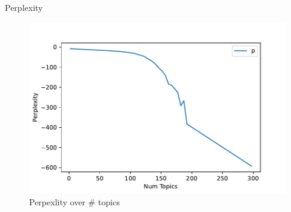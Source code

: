 \documentclass[aspectratio=169,xcolor=dvipsnames]{beamer}
\begin{document}
\begin{frame}{Perplexity}
    \vspace{-10mm}
    \begin{figure}
        \centering
        \includegraphics[width=.8\textwidth]{images/topic_count.pdf}
        \caption{Perpexlity over \# topics}
        \label{fig:perplexity}
    \end{figure}
\end{frame}
\end{document}
